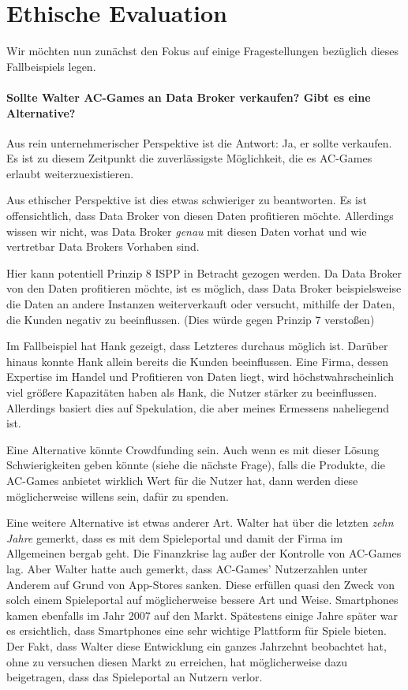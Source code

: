 \section*{Ethische Evaluation}

Wir möchten nun zunächst den Fokus auf einige Fragestellungen bezüglich dieses Fallbeispiels legen.

\paragraph*{Sollte Walter AC-Games an Data Broker verkaufen? Gibt es eine Alternative?}

Aus rein unternehmerischer Perspektive ist die Antwort: Ja, er sollte verkaufen.
Es ist zu diesem Zeitpunkt die zuverlässigste Möglichkeit, die es AC-Games erlaubt weiterzuexistieren.

Aus ethischer Perspektive ist dies etwas schwieriger zu beantworten.
Es ist offensichtlich, dass Data Broker von diesen Daten profitieren möchte.
Allerdings wissen wir nicht, was Data Broker \emph{genau} mit diesen Daten vorhat und wie vertretbar Data Brokers Vorhaben sind.

Hier kann potentiell Prinzip 8 ISPP in Betracht gezogen werden.
Da Data Broker von den Daten profitieren möchte, ist es möglich, dass Data Broker beispielsweise die Daten an andere Instanzen weiterverkauft 
oder versucht, mithilfe der Daten, die Kunden negativ zu beeinflussen. (Dies würde gegen Prinzip 7 verstoßen)

Im Fallbeispiel hat Hank gezeigt, dass Letzteres durchaus möglich ist.
Darüber hinaus konnte Hank allein bereits die Kunden beeinflussen.
Eine Firma, dessen Expertise im Handel und Profitieren von Daten liegt, wird höchstwahrscheinlich viel größere Kapazitäten haben als Hank, die Nutzer stärker zu beeinflussen.
Allerdings basiert dies auf Spekulation, die aber meines Ermessens naheliegend ist.

Eine Alternative könnte Crowdfunding sein. 
Auch wenn es mit dieser Lösung Schwierigkeiten geben könnte (siehe die nächste Frage),
falls die Produkte, die AC-Games anbietet wirklich Wert für die Nutzer hat, dann werden diese möglicherweise willens sein, dafür zu spenden.

Eine weitere Alternative ist etwas anderer Art.
Walter hat über die letzten \emph{zehn Jahre} gemerkt, dass es mit dem Spieleportal und damit der Firma im Allgemeinen bergab geht.
Die Finanzkrise lag außer der Kontrolle von AC-Games lag. Aber Walter hatte auch gemerkt, 
dass AC-Games' Nutzerzahlen unter Anderem auf Grund von App-Stores sanken. 
Diese erfüllen quasi den Zweck von solch einem Spieleportal auf möglicherweise bessere Art und Weise.
Smartphones kamen ebenfalls im Jahr 2007 auf den Markt.
Spätestens einige Jahre später war es ersichtlich, dass Smartphones eine sehr wichtige Plattform für Spiele bieten.
Der Fakt, dass Walter diese Entwicklung ein ganzes Jahrzehnt beobachtet hat, ohne zu versuchen diesen Markt zu erreichen, 
hat möglicherweise dazu beigetragen, dass das Spieleportal an Nutzern verlor.


